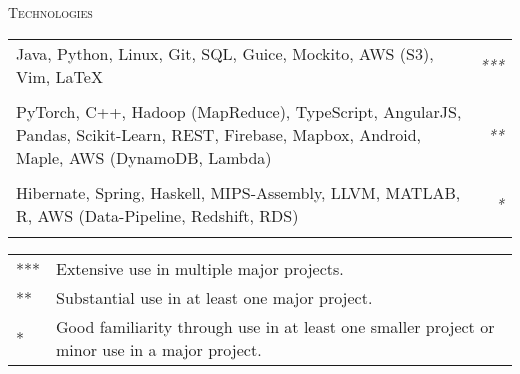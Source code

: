 \documentclass[11pt]{article}
\begin{document}

\midrule
\textsc{Technologies}

\begin{tabularx}{\textwidth}{X r}
    Java, Python, Linux, Git, SQL, Guice, Mockito, AWS (S3), Vim, \LaTeX{}
    & \textit{***} \\\\

    PyTorch, C++, Hadoop (MapReduce), TypeScript, AngularJS, Pandas, Scikit-Learn, REST,
    Firebase, Mapbox, Android, Maple, AWS (DynamoDB, Lambda)
    & \textit{**} \\\\

    Hibernate, Spring, Haskell, MIPS-Assembly, LLVM, MATLAB, R, AWS (Data-Pipeline,
    Redshift, RDS)
    & \textit{*} \\\\
\end{tabularx}
\begin{tiny}{}
\begin{tabular}{l l}
    *** & Extensive use in multiple major projects. \\
    ** & Substantial use in at least one major project. \\
    * & Good familiarity through use in at least one smaller project or minor use in a
    major project.
\end{tabular}
\end{tiny}


\end{document}
